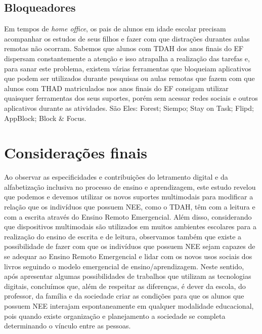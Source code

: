 \documentclass{textolivre}
\begin{document}
\subsection{Bloqueadores}
Em tempos de \textit{home office}, os pais de alunos em idade escolar precisam acompanhar os estudos de seus filhos e fazer com que distrações durantes aulas remotas não ocorram. Sabemos que alunos com TDAH dos anos finais do EF dispersam constantemente a atenção e isso atrapalha a realização das tarefas e, para sanar este problema, existem várias ferramentas que bloqueiam aplicativos que podem ser utilizados durante pesquisas ou aulas remotas que fazem com que alunos com THAD matriculados nos anos finais do EF consigam utilizar quaisquer ferramentas dos seus suportes, porém sem acessar redes sociais e outros aplicativos durante as atividades. São Eles: Forest; Siempo; Stay on Task; Flipd; AppBlock; Block \& Focus.


\section{Considerações finais}\label{sec-consideracoes}
Ao observar as especificidades e contribuições do letramento digital e da alfabetização inclusiva no processo de ensino e aprendizagem, este estudo revelou que podemos e devemos utilizar os novos suportes multimodais para modificar a relação que os indivíduos que possuem NEE, como o TDAH, têm com a leitura e com a escrita através do Ensino Remoto Emergencial. Além disso, considerando que dispositivos multimodais são utilizados em muitos ambientes escolares para a realização do ensino de escrita e de leitura, observamos também que existe a possibilidade de fazer com que os indivíduos que possuem NEE sejam capazes de se adequar ao Ensino Remoto Emergencial e lidar com os novos usos sociais dos livros seguindo o modelo emergencial de ensino/aprendizagem. Neste sentido, após apresentar algumas possibilidades de trabalhos que utilizam as tecnologias digitais, concluímos que, além de respeitar as diferenças, é dever da escola, do professor, da família e da sociedade criar as condições para que os alunos que possuem NEE interajam espontaneamente em qualquer modalidade educacional, pois quando existe organização e planejamento a sociedade se completa determinando o vínculo entre as pessoas. 
\end{document}
